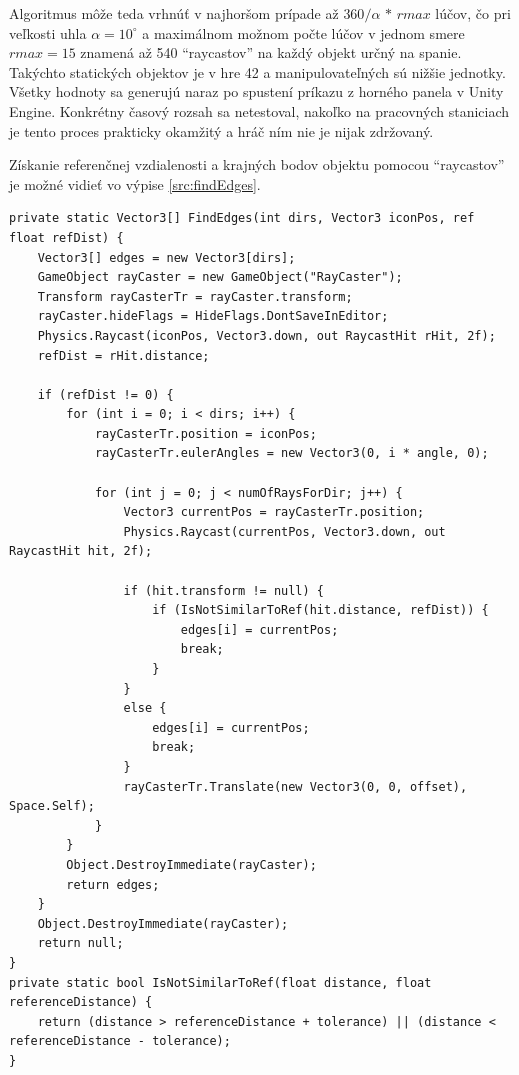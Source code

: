 \documentclass[slovak, bachelorpractice]{diploma}
\begin{document}
Algoritmus môže teda vrhnúť v najhoršom prípade až $360/\alpha\, *\, rmax$ lúčov, čo pri veľkosti uhla $\alpha = 10^{\circ}$ a maximálnom možnom počte lúčov v jednom smere $rmax = 15$ znamená až 540 \enquote{raycastov} na každý objekt určný na spanie. Takýchto statických objektov je v hre 42 a manipulovateľných sú nižšie jednotky. Všetky hodnoty sa generujú naraz po spustení príkazu z horného panela v Unity Engine. Konkrétny časový rozsah sa netestoval, nakoľko na pracovných staniciach je tento proces prakticky okamžitý a hráč ním nie je nijak zdržovaný.

Získanie referenčnej vzdialenosti a krajných bodov objektu pomocou \enquote{raycastov} je možné vidieť vo výpise \ref{src:findEdges}.

\vspace{4pt}
\begin{lstlisting}[label=src:findEdges,caption={Získanie referenčnej vzdialenosti a krajných bodov objektu}]
private static Vector3[] FindEdges(int dirs, Vector3 iconPos, ref float refDist) {
    Vector3[] edges = new Vector3[dirs];
    GameObject rayCaster = new GameObject("RayCaster");
    Transform rayCasterTr = rayCaster.transform;
    rayCaster.hideFlags = HideFlags.DontSaveInEditor;
    Physics.Raycast(iconPos, Vector3.down, out RaycastHit rHit, 2f);
    refDist = rHit.distance;

    if (refDist != 0) {
        for (int i = 0; i < dirs; i++) {
            rayCasterTr.position = iconPos;
            rayCasterTr.eulerAngles = new Vector3(0, i * angle, 0);

            for (int j = 0; j < numOfRaysForDir; j++) {
                Vector3 currentPos = rayCasterTr.position;
                Physics.Raycast(currentPos, Vector3.down, out RaycastHit hit, 2f);

                if (hit.transform != null) {
                    if (IsNotSimilarToRef(hit.distance, refDist)) {
                        edges[i] = currentPos;
                        break;
                    }
                }
                else {
                    edges[i] = currentPos;
                    break;
                }
                rayCasterTr.Translate(new Vector3(0, 0, offset), Space.Self);
            }
        }
        Object.DestroyImmediate(rayCaster);
        return edges;
    }
    Object.DestroyImmediate(rayCaster);
    return null;
}
private static bool IsNotSimilarToRef(float distance, float referenceDistance) {
    return (distance > referenceDistance + tolerance) || (distance < referenceDistance - tolerance);
}
\end{lstlisting}
\end{document}

